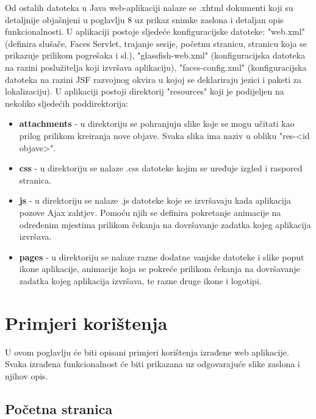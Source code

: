 \documentclass{foi}
\begin{document}
Od ostalih datoteka u Java web-aplikaciji nalaze se .xhtml dokumenti koji su detaljnije objašnjeni u poglavlju 8 uz prikaz snimke zaslona i detaljan opis funkcionalnosti. U aplikaciji postoje sljedeće konfiguracijske datoteke: "web.xml" (definira slušače, Faces Servlet, trajanje sesije, početnu stranicu, stranicu koja se prikazuje prilikom pogrešaka i sl.), "glassfish-web.xml" (konfiguracijska datoteka na razini poslužitelja koji izvršava aplikaciju), "faces-config.xml" (konfiguracijska datoteka na razini JSF razvojnog okvira u kojoj se deklariraju jezici i paketi za lokalizaciju). U aplikaciji postoji direktorij "resources" koji je podijeljen na nekoliko sljedećih poddirektorija:
\begin{itemize}
\item \textbf{attachments} - u direktoriju se pohranjuju slike koje se mogu učitati kao prilog prilikom kreiranja nove objave. Svaka slika ima naziv u obliku "res-<id objave>".
\item \textbf{css} - u direktoriju se nalaze .css datoteke kojim se uređuje izgled i raspored stranica.
\item \textbf{js} - u direktoriju se nalaze .js datoteke koje se izvršavaju kada aplikacija pozove Ajax zahtjev. Pomoću njih se definira pokretanje animacije na određenim mjestima prilikom čekanja na dovršavanje zadatka kojeg aplikacija izvršava.
\item \textbf{pages} - u direktoriju se nalaze razne dodatne vanjske datoteke i slike poput ikone aplikacije, animacije koja se pokreće prilikom čekanja na dovršavanje zadatka kojeg aplikacija izvršava, te razne druge ikone i logotipi.
\end{itemize}

\chapter{Primjeri korištenja}

U ovom poglavlju će biti opisani primjeri korištenja izrađene web aplikacije. Svaka izrađena funkcionalnost će biti prikazana uz odgovarajuće slike zaslona i njihov opis.

\section{Početna stranica}
\end{document}
